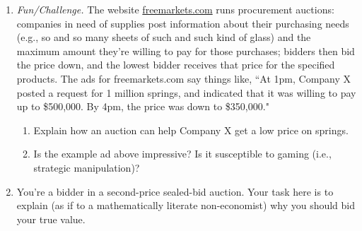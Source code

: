 \begin{enumerate}


\item \emph{Fun/Challenge.} The website \href{http://www.freemarkets.com}{freemarkets.com} runs procurement auctions: companies in need of supplies post information about their purchasing needs (e.g., so and so many sheets of such and such kind of glass) and the maximum amount they're willing to pay for those purchases; bidders then bid the price down, and the lowest bidder receives that price for the specified products. The ads for freemarkets.com say things like, ``At 1pm, Company X posted a request for 1 million springs, and indicated that it was willing to pay up to \$500,000. By 4pm, the price was down to \$350,000."

    \begin{enumerate}

    \item  Explain how an auction can help Company X get a low price on springs.


    \item Is the example ad above impressive? Is it susceptible to gaming (i.e., strategic manipulation)?

    \end{enumerate}








\item You're a bidder in a second-price sealed-bid auction. Your task here is to explain (as if to a mathematically literate non-economist) why you should bid your true value.


\end{enumerate}
